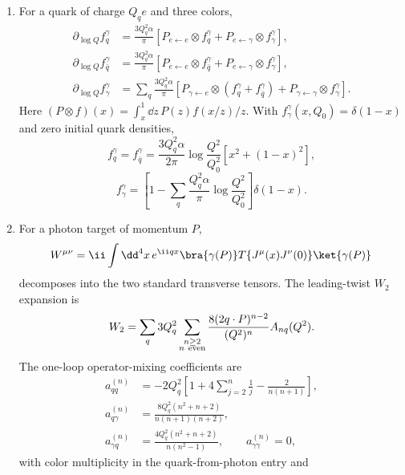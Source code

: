\begin{enumerate}
  \begin{enumerate}
    \item[(a)] For a quark of charge \(Q_qe\) and three colors,
      \[
      \begin{split}
        \partial_{\log Q}f_q^\gamma
          &=\frac{3Q_q^2\alpha}{\pi}
            [P_{e\leftarrow e}\otimes f_q^\gamma+
             P_{e\leftarrow\gamma}\otimes f_\gamma^\gamma],\\
        \partial_{\log Q}f_{\bar q}^\gamma
          &=\frac{3Q_q^2\alpha}{\pi}
            [P_{e\leftarrow e}\otimes f_{\bar q}^\gamma+
             P_{e\leftarrow\gamma}\otimes f_\gamma^\gamma],\\
        \partial_{\log Q}f_\gamma^\gamma
          &=\sum_q\frac{3Q_q^2\alpha}{\pi}
            [P_{\gamma\leftarrow e}\otimes
             (f_q^\gamma+f_{\bar q}^\gamma)
             +P_{\gamma\leftarrow\gamma}\otimes f_\gamma^\gamma].
      \end{split}
      \]
      Here \((P\otimes f)(x)=\int_x^1\dd z\,P(z)f(x/z)/z\).
      With \(f_\gamma^\gamma(x,Q_0)=\delta(1-x)\) and zero initial quark
      densities,
      \[
        f_q^\gamma=f_{\bar q}^\gamma
          =\frac{3Q_q^2\alpha}{2\pi}
            \log\frac{Q^2}{Q_0^2}[x^2+(1-x)^2],
      \]
      \[
        f_\gamma^\gamma=
        \left[1-\sum_q\frac{Q_q^2\alpha}{\pi}
          \log\frac{Q^2}{Q_0^2}\right]\delta(1-x).
      \]
    \item[(b)] For a photon target of momentum \(P\),
      \[
        W^{\mu\nu}=\ii\int \dd^4x\,e^{\ii qx}
        \bra{\gamma(P)}T\{J^\mu(x)J^\nu(0)\}\ket{\gamma(P)}
      \]
      decomposes into the two standard transverse tensors.  The
      leading-twist \(W_2\) expansion is
      \[
        W_2=\sum_q3Q_q^2\sum_{\substack{n\ge2\\n\ {\rm even}}}
        \frac{8(2q\cdot P)^{n-2}}{(Q^2)^n}A_{nq}(Q^2).
      \]
      The one-loop operator-mixing coefficients are
      \[
      \begin{split}
        a_{qq}^{(n)}&=-2Q_q^2\left[
          1+4\sum_{j=2}^n\frac1j-\frac{2}{n(n+1)}\right],\\
        a_{q\gamma}^{(n)}
          &=\frac{8Q_q^2(n^2+n+2)}{n(n+1)(n+2)},\\
        a_{\gamma q}^{(n)}
          &=\frac{4Q_q^2(n^2+n+2)}{n(n^2-1)},\qquad
        a_{\gamma\gamma}^{(n)}=0,
      \end{split}
      \]
      with color multiplicity in the quark-from-photon entry and

\end{enumerate}
\end{enumerate}
